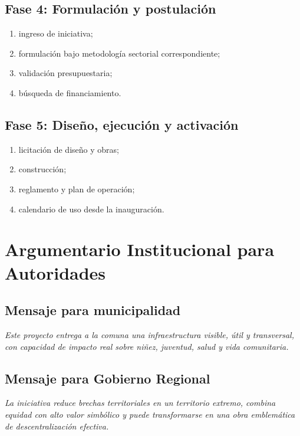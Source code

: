 \documentclass[12pt,letterpaper]{article}
\begin{document}
\subsection{Fase 4: Formulación y postulación}

\begin{enumerate}
    \item ingreso de iniciativa;
    \item formulación bajo metodología sectorial correspondiente;
    \item validación presupuestaria;
    \item búsqueda de financiamiento.
\end{enumerate}

\subsection{Fase 5: Diseño, ejecución y activación}

\begin{enumerate}
    \item licitación de diseño y obras;
    \item construcción;
    \item reglamento y plan de operación;
    \item calendario de uso desde la inauguración.
\end{enumerate}

\section{Argumentario Institucional para Autoridades}

\subsection{Mensaje para municipalidad}

\textit{Este proyecto entrega a la comuna una infraestructura visible, útil y transversal, con capacidad de impacto real sobre niñez, juventud, salud y vida comunitaria.}

\subsection{Mensaje para Gobierno Regional}

\textit{La iniciativa reduce brechas territoriales en un territorio extremo, combina equidad con alto valor simbólico y puede transformarse en una obra emblemática de descentralización efectiva.}
\end{document}
